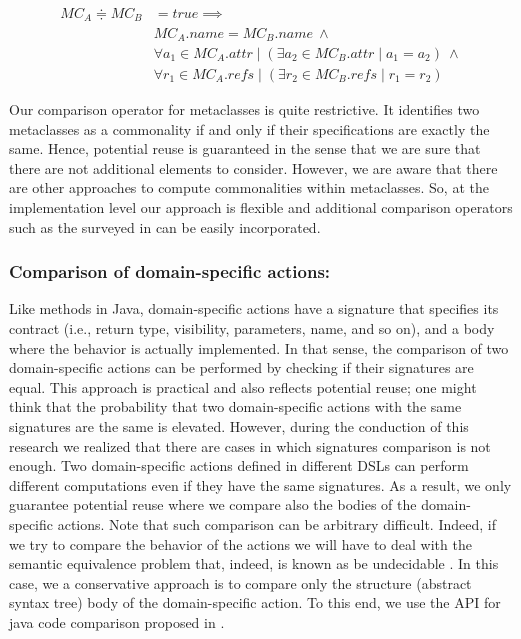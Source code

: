 \begin{equation}
\begin{split}
  MC_{A} \doteqdot MC_{B} &= true \implies \\
   & MC_{A}.name = MC_{B}.name ~ \wedge \\
   & \forall a_1 \in MC_{A}.attr \mid (\exists a_2 \in MC_{B}.attr \mid a_1 = a_2) ~ \wedge \\
   & \forall r_1 \in MC_{A}.refs \mid (\exists r_2 \in MC_{B}.refs \mid r_1 = r_2)
  \end{split}
\end{equation}

Our comparison operator for metaclasses is quite restrictive. It identifies two metaclasses as a commonality if and only if their specifications are exactly the same. Hence, potential reuse is guaranteed in the sense that we are sure that there are not additional elements to consider. However, we are aware that there are other approaches to compute commonalities within metaclasses. So, at the implementation level our approach is flexible and additional comparison operators such as the surveyed in \cite{Lafi:2011} can be easily incorporated.

\vspace{-3mm}
\subsubsection{Comparison of domain-specific actions:} Like methods in Java, domain-specific actions have a signature that specifies its contract (i.e., return type, visibility, parameters, name, and so on), and a body where the behavior is actually implemented. In that sense, the comparison of two domain-specific actions can be performed by checking if their signatures are equal. This approach is practical and also reflects potential reuse; one might think that the probability that two domain-specific actions with the same signatures are the same is elevated. However, during the conduction of this research we realized that there are cases in which signatures comparison is not enough. Two domain-specific actions defined in different DSLs can perform different computations even if they have the same signatures. As a result, we only guarantee potential reuse where we compare also the bodies of the domain-specific actions. Note that such comparison can be arbitrary difficult. Indeed, if we try to compare  the behavior of the actions we will have to deal with the semantic equivalence problem that, indeed, is known as be undecidable \cite{Lucanu:2013}. In this case, we a conservative approach is to compare only the structure (abstract syntax tree) body of the domain-specific action. To this end, we use the API for java code comparison proposed in \cite{Biegel:2010}.

